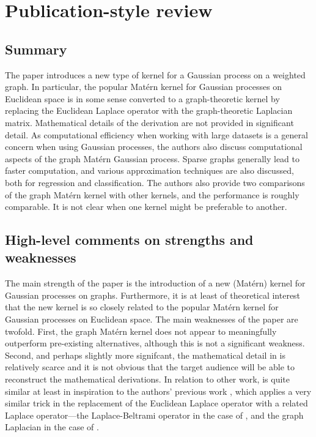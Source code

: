 

\section{Publication-style review}

\subsection{Summary}

The paper \cite{pmlr-v130-borovitskiy21a} introduces a new type of kernel for a Gaussian process on a weighted graph. In particular, the popular Mat\'{e}rn kernel for Gaussian processes on Euclidean space is in some sense converted to a graph-theoretic kernel by replacing the Euclidean Laplace operator with the graph-theoretic Laplacian matrix. Mathematical details of the derivation are not provided in significant detail. As computational efficiency when working with large datasets is a general concern when using Gaussian processes, the authors also discuss computational aspects of the graph Mat\'{e}rn Gaussian process. Sparse graphs generally lead to faster computation, and various approximation techniques are also discussed, both for regression and classification. The authors also provide two comparisons of the graph Mat\'{e}rn kernel with other kernels, and the performance is roughly comparable. It is not clear when one kernel might be preferable to another.

\subsection{High-level comments on strengths and weaknesses}

The main strength of the paper is the introduction of a new (Mat\'{e}rn) kernel for Gaussian processes on graphs. Furthermore, it is at least of theoretical interest that the new kernel is so closely related to the popular Mat\'{e}rn kernel for Gaussian processes on Euclidean space. The main weaknesses of the paper are twofold. First, the graph Mat\'{e}rn kernel does not appear to meaningfully outperform pre-existing alternatives, although this is not a significant weakness. Second, and perhaps slightly more signifcant, the mathematical detail in \cite{pmlr-v130-borovitskiy21a} is relatively scarce and it is not obvious that the target audience will be able to reconstruct the mathematical derivations. In relation to other work, \cite{pmlr-v130-borovitskiy21a} is quite similar at least in inspiration to the authors' previous work \cite{NEURIPS2020_92bf5e62}, which applies a very similar trick in the replacement of the Euclidean Laplace operator with a related Laplace operator---the Laplace-Beltrami operator in the case of \cite{NEURIPS2020_92bf5e62}, and the graph Laplacian in the case of \cite{pmlr-v130-borovitskiy21a}.

